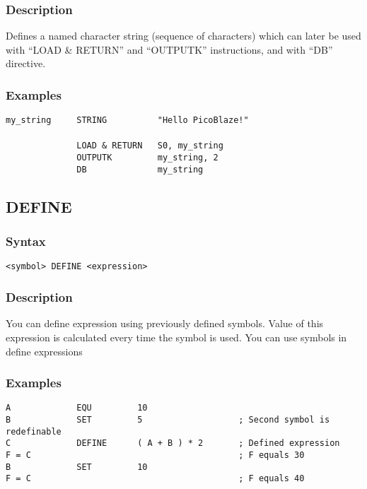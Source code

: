         \subsubsection{Description}
            Defines a named character string (sequence of characters) which can later be used with ``LOAD & RETURN'' and ``OUTPUTK'' instructions, and with ``DB'' directive.

        \subsubsection{Examples}
            \verb'my_string     STRING          "Hello PicoBlaze!"'\\
            \verb''\\
            \verb'              LOAD & RETURN   S0, my_string'\\
            \verb'              OUTPUTK         my_string, 2'\\
            \verb'              DB              my_string'

    \subsection{DEFINE}
        \subsubsection{Syntax}
            \verb'<symbol> DEFINE <expression>'

        \subsubsection{Description}
            You can define expression using previously defined symbols. Value of this expression is calculated every time the symbol is used. You can use symbols in define expressions

        \subsubsection{Examples}
            \verb'A             EQU         10'\\
            \verb'B             SET         5                   ; Second symbol is redefinable'\\
            \verb'C             DEFINE      ( A + B ) * 2       ; Defined expression'\\
            \verb'F = C                                         ; F equals 30'\\
            \verb'B             SET         10'\\
            \verb'F = C                                         ; F equals 40'

